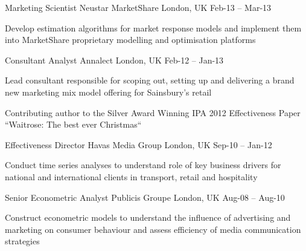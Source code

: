 \begin{cventries}
  \cventry
    {Marketing Scientist} %
    {Neustar MarketShare} %
    {London, UK} %
    {Feb-13 – Mar-13} %
    {
      \begin{cvitems} %
        \item {Develop estimation algorithms for market response models and implement them into MarketShare proprietary modelling and optimisation platforms}
      \end{cvitems}
      }
    
  \cventry
    {Consultant Analyst} %
    {Annalect} %
    {London, UK} %
    {Feb-12 – Jan-13} %
    {
      \begin{cvitems} %
        \item {Lead consultant responsible for scoping out, setting up and delivering a brand new marketing mix model offering for Sainsbury’s retail}
        \item {Contributing author to the Silver Award Winning IPA 2012 Effectiveness Paper “Waitrose: The best ever Christmas“}
      \end{cvitems}
    }
    
  \cventry
    {Effectiveness Director} %
    {Havas Media Group} %
    {London, UK} %
    {Sep-10 – Jan-12} %
    {
      \begin{cvitems} %
        \item {Conduct time series analyses to understand role of key business drivers for national and international clients in transport, retail and hospitality}
      \end{cvitems}
    }

  \cventry
    {Senior Econometric Analyst} %
    {Publicis Groupe} %
    {London, UK} %
    {Aug-08 – Aug-10} %
    {
      \begin{cvitems} %
        \item {Construct econometric models to understand the influence of advertising and marketing on consumer behaviour and assess efficiency of media communication strategies}
      \end{cvitems}
    }


\end{cventries}
